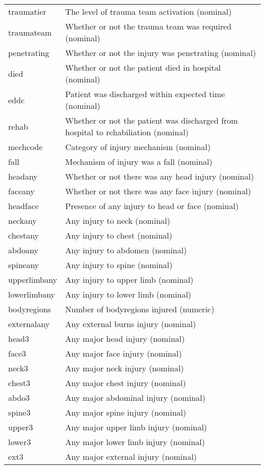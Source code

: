 \begin{longtable}{lp{13cm}}
traumatier & The level of trauma team activation (nominal) \\ 
traumateam & Whether or not the trauma team was required (nominal) \\ 
penetrating & Whether or not the injury was penetrating (nominal) \\ 
died & Whether or not the patient died in hospital (nominal) \\ 
eddc & Patient was discharged within expected time (nominal) \\ 
rehab & Whether or not the patient was discharged from hospital to rehabiliation (nominal) \\ 
mechcode & Category of injury mechanism (nominal) \\ 
fall & Mechanism of injury was a fall (nominal) \\ 
headany & Whether or not there was any head injury (nominal) \\ 
faceany & Whether or not there was any face injury (nominal) \\ 
headface & Presence of any injury to head or face (nominal) \\ 
neckany & Any injury to neck (nominal) \\ 
chestany & Any injury to chest (nominal) \\ 
abdoany & Any injury to abdomen (nominal) \\ 
spineany & Any injury to spine (nominal) \\ 
upperlimbany & Any injury to upper limb (nominal) \\ 
lowerlimbany & Any injury to lower limb (nominal) \\ 
bodyregions & Number of bodyregions injured (numeric) \\ 
externalany & Any external burns injury (nominal) \\ 
head3 & Any major head injury (nominal) \\ 
face3 & Any major face injury (nominal) \\ 
neck3 & Any major neck injury (nominal) \\ 
chest3 & Any major chest injury (nominal) \\ 
abdo3 & Any major abdominal injury (nominal) \\ 
spine3 & Any major spine injury (nominal) \\ 
upper3 & Any major upper limb injury (nominal) \\ 
lower3 & Any major lower limb injury (nominal) \\ 
ext3 & Any major external injury (nominal) \\ 

\end{longtable}
